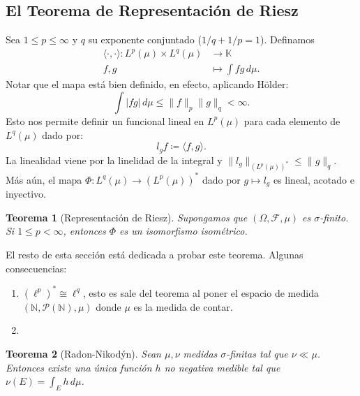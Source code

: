 \documentclass{article}
\newtheorem{Teorema}{Teorema}
\theoremstyle{plain}
\theoremstyle{definition}
\newcommand{\1}[1]{\mathbbm{1}\left( #1 \right)}
\newcommand{\N}{\mathbb{N}}
\newcommand{\K}{\mathbb{K}}
\newcommand{\abs}[1]{\lvert #1 \rvert}
\newcommand{\norm}[1]{\lVert #1 \rVert}
\begin{document}
\subsection*{El Teorema de Representación de Riesz}

Sea \(1\le p \le \infty\) y \(q\) su exponente conjuntado (\(1/q+1/p = 1\)). Definamos
\begin{equation}
\begin{aligned}
  \langle \cdot,\cdot \rangle\colon L^p(\mu)\times L^q(\mu) &\to \K\\
  f,g &\mapsto \int fg\, d\mu.
\end{aligned}
\end{equation}
Notar que el mapa está bien definido, en efecto, aplicando Hölder:
\begin{displaymath}
  \int \abs{fg} \, d\mu \le \norm{f}_p \norm{g}_q < \infty.
\end{displaymath}
Esto nos permite definir un funcional lineal en \(L^p(\mu)\) para cada elemento de 
\(L^q(\mu)\) dado por:
\begin{displaymath}
  l_{g}f \coloneqq \langle f,g \rangle.
\end{displaymath}
La linealidad viene por la linelidad de la integral y \(\norm{l_g}_{(L^p(\mu))^{\ast}} \le \norm{g}_{q}\). 
Más aún, el mapa \(\Phi\colon L^q(\mu) \to (L^p(\mu))^{\ast}\) dado por \(g\mapsto l_g\) es lineal,
acotado e inyectivo.

\begin{Teorema}[Representación de Riesz]
  Supongamos que \((\Omega,\mathcal{F},\mu)\) es \(\sigma\)-finito. Si \(1\le p < \infty\), entonces
  \(\Phi\) es un isomorfismo isométrico. 
\end{Teorema}

El resto de esta sección está dedicada a probar este teorema. Algunas consecuencias:
\begin{enumerate}
  \item \((\ell^p)^{\ast} \cong \ell^q\), esto es sale del teorema al poner el espacio de medida
  \((\N,\mathcal{P}(\N),\mu)\) donde \(\mu\) es la medida de contar. 
  \item 
\end{enumerate}

\begin{Teorema}[Radon-Nikodýn]
  Sean \(\mu,\nu\) medidas \(\sigma\)-finitas tal que \(\nu \ll \mu\). Entonces existe una única
  función \(h\) no negativa medible tal que \(\nu(E) = \int_{E} h\, d\mu\).  
\end{Teorema}
\end{document}
